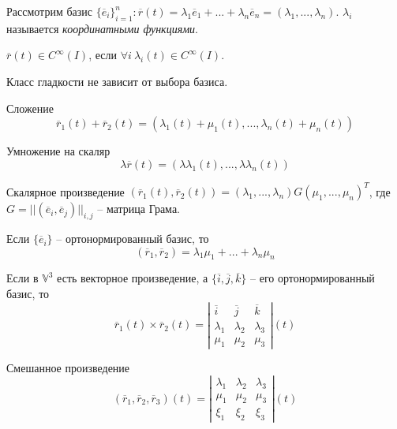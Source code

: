 \begin{Def}
	Рассмотрим базис $\{\overline{e}_i\}_{i = 1}^n : \overline{r}(t) = \lambda_1 \overline{e}_1 + ... + \lambda_n \overline{e}_n = (\lambda_1, ..., \lambda_n)$.
	$\lambda_i$ называется \textit{координатными функциями}.
\end{Def}

\begin{Def}
	$\overline{r}(t) \in C^\infty (I)$, если $\forall i \ \lambda_i(t) \in C^\infty(I)$. 
\end{Def}

\begin{Rem}
	Класс гладкости не зависит от выбора базиса.
\end{Rem}

\begin{Thm}
	\begin{MyList}
		\item Сложение
		\[\overline{r}_1(t) + \overline{r}_2(t) = (\lambda_1(t) + \mu_1(t), ..., \lambda_n(t) + \mu_n(t))\]

		\item Умножение на скаляр
		\[\lambda \overline{r}(t) = (\lambda \lambda_1(t), ..., \lambda \lambda_n(t))\]

		\item Скалярное произведение
		$(\overline{r}_1(t), \overline{r}_2(t)) = (\lambda_1, ..., \lambda_n) G (\mu_1, ..., \mu_n)^T$, где $G = ||(\overline{e}_i, \overline{e}_j)||_{i, j}$ -- матрица Грама.
		
		Если $\{\overline{e}_i\}$ -- ортонормированный базис, то
		\[(\overline{r}_1, \overline{r}_2) = \lambda_1 \mu_1 + ... + \lambda_n \mu_n\]

		\item Если в $\mathbb{V}^3$ есть векторное произведение, а $\{\overline{i}, \overline{j}, \overline{k}\}$ -- его ортонормированный базис, то
		\[\overline{r}_1(t) \times \overline{r}_2(t) = \left|\begin{array}{ccc}
		\overline{i} & \overline{j} & \overline{k} \\ 
		\lambda_1 & \lambda_2 & \lambda_3 \\ 
		\mu_1 & \mu_2 & \mu_3
		\end{array}\right|(t)\]
		
		\item Смешанное произведение
		\[(\overline{r}_1, \overline{r}_2, \overline{r}_3)(t) = \left|\begin{array}{ccc}
		\lambda_1 & \lambda_2 & \lambda_3 \\ 
		\mu_1 & \mu_2 & \mu_3 \\ 
		\xi_1 & \xi_2 & \xi_3
		\end{array}\right|(t)\]


\end{MyList}
\end{Thm}
